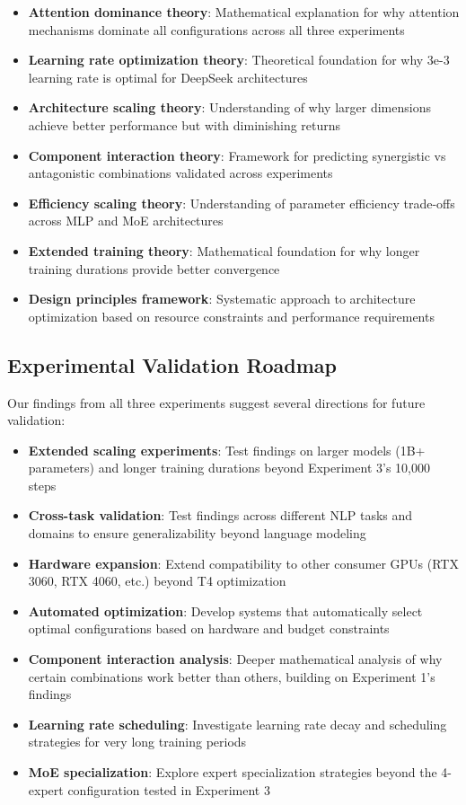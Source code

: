 \documentclass[11pt,a4paper]{article}
\begin{document}
\begin{itemize}
    \item \textbf{Attention dominance theory}: Mathematical explanation for why attention mechanisms dominate all configurations across all three experiments
    \item \textbf{Learning rate optimization theory}: Theoretical foundation for why 3e-3 learning rate is optimal for DeepSeek architectures
    \item \textbf{Architecture scaling theory}: Understanding of why larger dimensions achieve better performance but with diminishing returns
    \item \textbf{Component interaction theory}: Framework for predicting synergistic vs antagonistic combinations validated across experiments
    \item \textbf{Efficiency scaling theory}: Understanding of parameter efficiency trade-offs across MLP and MoE architectures
    \item \textbf{Extended training theory}: Mathematical foundation for why longer training durations provide better convergence
    \item \textbf{Design principles framework}: Systematic approach to architecture optimization based on resource constraints and performance requirements
\end{itemize}

\subsection{Experimental Validation Roadmap}

Our findings from all three experiments suggest several directions for future validation:

\begin{itemize}
    \item \textbf{Extended scaling experiments}: Test findings on larger models (1B+ parameters) and longer training durations beyond Experiment 3's 10,000 steps
    \item \textbf{Cross-task validation}: Test findings across different NLP tasks and domains to ensure generalizability beyond language modeling
    \item \textbf{Hardware expansion}: Extend compatibility to other consumer GPUs (RTX 3060, RTX 4060, etc.) beyond T4 optimization
    \item \textbf{Automated optimization}: Develop systems that automatically select optimal configurations based on hardware and budget constraints
    \item \textbf{Component interaction analysis}: Deeper mathematical analysis of why certain combinations work better than others, building on Experiment 1's findings
    \item \textbf{Learning rate scheduling}: Investigate learning rate decay and scheduling strategies for very long training periods
    \item \textbf{MoE specialization}: Explore expert specialization strategies beyond the 4-expert configuration tested in Experiment 3
\end{itemize}
\end{document}
